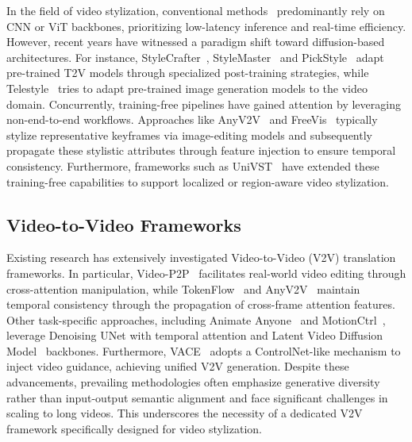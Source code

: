 \documentclass[runningheads]{llncs}
\begin{document}
In the field of video stylization, conventional methods~\cite{gao2018reconet,adain,ghiasi2017exploring} predominantly rely on CNN or ViT backbones, prioritizing low-latency inference and real-time efficiency. However, recent years have witnessed a paradigm shift toward diffusion-based architectures. For instance, StyleCrafter~\cite{liu2023stylecrafter}, StyleMaster~\cite{ye2025stylemaster} and PickStyle~\cite{pickstyle} adapt pre-trained T2V models through specialized post-training strategies, while Telestyle~\cite {telestyle} tries to adapt pre-trained image generation models to the video domain. Concurrently, training-free pipelines have gained attention by leveraging non-end-to-end workflows. Approaches like AnyV2V~\cite{kuanyv2v} and FreeVis~\cite{xu2025freevis} typically stylize representative keyframes via image-editing models and subsequently propagate these stylistic attributes through feature injection to ensure temporal consistency. Furthermore, frameworks such as UniVST~\cite{song2025univst} have extended these training-free capabilities to support localized or region-aware video stylization.

\subsection{Video-to-Video Frameworks}
Existing research has extensively investigated Video-to-Video (V2V) translation frameworks. In particular, Video-P2P~\cite{videop2p} facilitates real-world video editing through cross-attention manipulation, while TokenFlow~\cite{geyer2023tokenflow} and AnyV2V~\cite{kuanyv2v} maintain temporal consistency through the propagation of cross-frame attention features. Other task-specific approaches, including Animate Anyone~\cite{animateany} and MotionCtrl~\cite{wang2024motionctrl}, leverage Denoising UNet with temporal attention and Latent Video Diffusion Model~\cite{lvdm} backbones. Furthermore, VACE~\cite{jiang2025vace} adopts a ControlNet-like mechanism to inject video guidance, achieving unified V2V generation. Despite these advancements, prevailing methodologies often emphasize generative diversity rather than input-output semantic alignment and face significant challenges in scaling to long videos. This underscores the necessity of a dedicated V2V framework specifically designed for video stylization.
\end{document}
